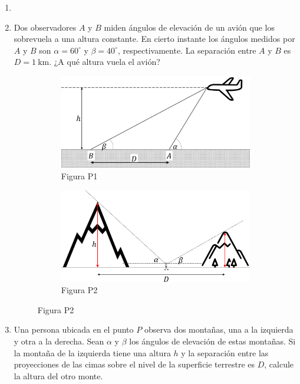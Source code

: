 \documentclass[letterpaper,11pt]{article}
\begin{document}
\vspace{-1cm}
\begin{enumerate}\setlength{\itemsep}{0.4cm}


\item[]

\item Dos observadores $A$ y $B$ miden ángulos de elevación de un avión que los sobrevuela a una altura constante. En cierto instante los ángulos medidos por $A$ y $B$ son $\alpha = 60^{\circ}$ y $\beta = 40^{\circ}$, respectivamente. La separación entre $A$ y  $B$ es $D = \SI{1}{\km}$. ¿A qué altura vuela el avión?

\begin{figure}[h!]
    \centering
    \begin{subfigure}[t]{0.4\textwidth}
        \centering
        \includegraphics[width=0.8\linewidth]{2021-1/Imagenes/aux0/avion.pdf}
        \caption*{Figura P1}
    \end{subfigure}
    \hspace{0.5cm}
    \begin{subfigure}[t]{0.4\textwidth}
        \centering
        \includegraphics[width=0.9\linewidth]{2021-1/Imagenes/aux0/mountain.pdf}
        \caption*{Figura P2}
    \end{subfigure}
\end{figure}

\item Una persona ubicada en el punto $P$ observa dos montañas, una a la izquierda y otra a la derecha. Sean $\alpha$ y $\beta$ los ángulos de elevación de estas montañas. Si la montaña de la izquierda tiene una altura $h$ y la separación entre las proyecciones de las cimas sobre el nivel de la superficie terrestre es $D$, calcule la altura del otro monte. 


\end{enumerate}
\end{document}
